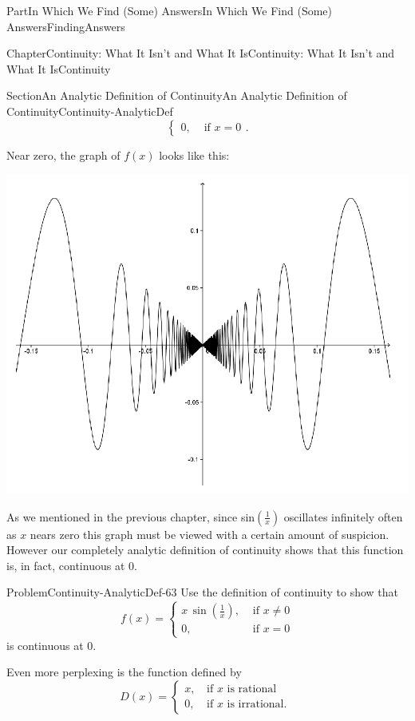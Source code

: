 \documentclass[oneside,10pt,]{book}
\numberwithin{equation}{part}
\newcommand{\amp}{&}
\begin{document}
\begin{partptx}{Part}{In Which We Find (Some) Answers}{}{In Which We Find (Some) Answers}{}{}{FindingAnswers}
\begin{chapterptx}{Chapter}{Continuity: What It Isn't and What It Is}{}{Continuity: What It Isn't and What It Is}{}{}{Continuity}
\begin{sectionptx}{Section}{An Analytic Definition of Continuity}{}{An Analytic Definition of Continuity}{}{}{Continuity-AnalyticDef}
\begin{equation*}
\begin{cases}
0, \amp \text{ if } x=0 
\end{cases}  \text{.}
\end{equation*}
%
\par
Near zero, the graph of \(f(x)\) looks like this:%
\begin{image}{0.125}{0.75}{0.125}{}%
\includegraphics[width=\linewidth]{external/images/Ch5fig4.png}
\end{image}%
As we mentioned in the previous chapter, since sin\(\left(\frac{1}{x}\right)\) oscillates infinitely often as \(x\) nears zero this graph must be viewed with a certain amount of suspicion.  However our completely analytic definition of continuity shows that this function is, in fact, continuous at 0.%
\begin{problem}{Problem}{}{Continuity-AnalyticDef-63}%
Use the definition of continuity to show that%
\begin{equation*}
f(x)= \begin{cases}
x\,\sin\left(\frac{1}{x}\right),\amp \text{ if } x\neq 0\\ 
0, \amp \text{ if } x=0 
\end{cases}
\end{equation*}
is continuous at \(0\).%
\end{problem}
Even more perplexing is the function defined by%
\begin{equation*}
D(x)=
\left\{ 
\begin{matrix}
x\text{,} \amp \text{ if } x\text{ is rational } \\
0\text{,} \amp \text{ if } x\text{ is irrational. } 

\end{matrix}
\end{equation*}
\end{sectionptx}
\end{chapterptx}
\end{partptx}
\end{document}
